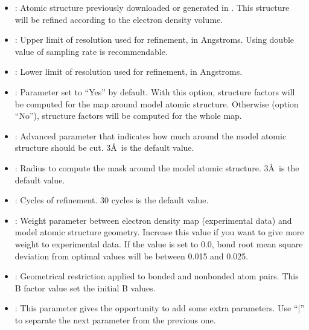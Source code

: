 \begin{itemize}
\begin{itemize}
     \item {}: Atomic structure previously downloaded or generated in \scipion. This structure will be refined according to the electron density volume.
     
     \item {}: Upper limit of resolution used for refinement, in Angstroms. Using double value of sampling rate is recommendable. 
     
     \item {}: Lower limit of resolution used for refinement, in Angstroms.
     
     \item {}: Parameter set to ``Yes'' by default. With this option, structure factors will be computed for the map around model atomic structure. Otherwise (option ``No''), structure factors will be computed for the whole map.
     
     \item {}: Advanced parameter that indicates how much around the model atomic structure should be cut. 3\AA\ is the default value.
     
     \item {}: Radius to compute the mask around the model atomic structure. 3\AA\ is the default value.
     
     \item {}: Cycles of refinement. 30 cycles is the default value.
     
     \item {}: Weight parameter between electron density map (experimental data) and model atomic structure geometry. Increase this value if you want to give more weight to experimental data. If the value is set to 0.0, bond root mean square deviation from optimal values will be between 0.015 and 0.025.
     
     \item {}: Geometrical restriction applied to bonded and nonbonded atom pairs. This B factor value set the initial B values.
     
     \item {}: This parameter gives the opportunity to add some extra  parameters. Use ``$|$'' to separate the next parameter from the previous one.
    \end{itemize}
    

\end{itemize}
